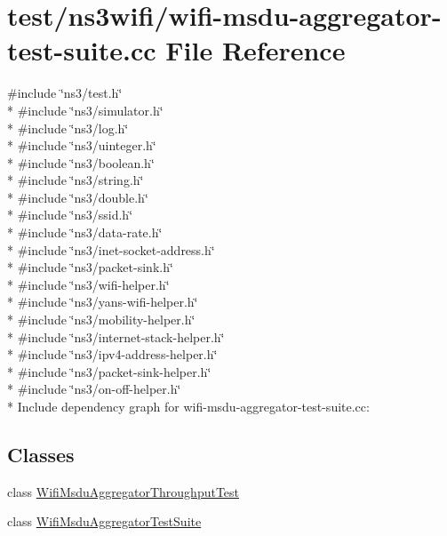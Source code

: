 \hypertarget{wifi-msdu-aggregator-test-suite_8cc}{}\section{test/ns3wifi/wifi-\/msdu-\/aggregator-\/test-\/suite.cc File Reference}
\label{wifi-msdu-aggregator-test-suite_8cc}
{\ttfamily \#include \char`\"{}ns3/test.\+h\char`\"{}}\\*
{\ttfamily \#include \char`\"{}ns3/simulator.\+h\char`\"{}}\\*
{\ttfamily \#include \char`\"{}ns3/log.\+h\char`\"{}}\\*
{\ttfamily \#include \char`\"{}ns3/uinteger.\+h\char`\"{}}\\*
{\ttfamily \#include \char`\"{}ns3/boolean.\+h\char`\"{}}\\*
{\ttfamily \#include \char`\"{}ns3/string.\+h\char`\"{}}\\*
{\ttfamily \#include \char`\"{}ns3/double.\+h\char`\"{}}\\*
{\ttfamily \#include \char`\"{}ns3/ssid.\+h\char`\"{}}\\*
{\ttfamily \#include \char`\"{}ns3/data-\/rate.\+h\char`\"{}}\\*
{\ttfamily \#include \char`\"{}ns3/inet-\/socket-\/address.\+h\char`\"{}}\\*
{\ttfamily \#include \char`\"{}ns3/packet-\/sink.\+h\char`\"{}}\\*
{\ttfamily \#include \char`\"{}ns3/wifi-\/helper.\+h\char`\"{}}\\*
{\ttfamily \#include \char`\"{}ns3/yans-\/wifi-\/helper.\+h\char`\"{}}\\*
{\ttfamily \#include \char`\"{}ns3/mobility-\/helper.\+h\char`\"{}}\\*
{\ttfamily \#include \char`\"{}ns3/internet-\/stack-\/helper.\+h\char`\"{}}\\*
{\ttfamily \#include \char`\"{}ns3/ipv4-\/address-\/helper.\+h\char`\"{}}\\*
{\ttfamily \#include \char`\"{}ns3/packet-\/sink-\/helper.\+h\char`\"{}}\\*
{\ttfamily \#include \char`\"{}ns3/on-\/off-\/helper.\+h\char`\"{}}\\*
Include dependency graph for wifi-\/msdu-\/aggregator-\/test-\/suite.cc\+:
\subsection*{Classes}
\begin{DoxyCompactItemize}
\item 
class \hyperlink{classWifiMsduAggregatorThroughputTest}{Wifi\+Msdu\+Aggregator\+Throughput\+Test}
\item 
class \hyperlink{classWifiMsduAggregatorTestSuite}{Wifi\+Msdu\+Aggregator\+Test\+Suite}
\end{DoxyCompactItemize}
